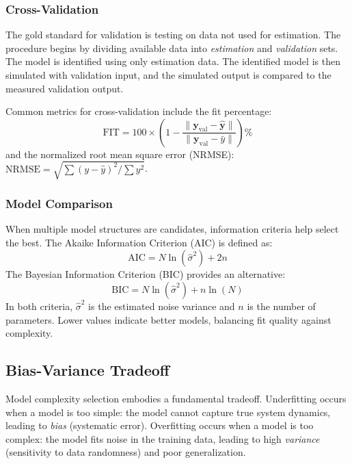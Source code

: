 \subsubsection{Cross-Validation}

The gold standard for validation is testing on data not used for estimation. The procedure begins by dividing available data into \textit{estimation} and \textit{validation} sets. The model is identified using only estimation data. The identified model is then simulated with validation input, and the simulated output is compared to the measured validation output.

Common metrics for cross-validation include the fit percentage:
\begin{equation}
\text{FIT} = 100 \times \left(1 - \frac{\|\mathbf{y}_\text{val} - \hat{\mathbf{y}}\|}{\|\mathbf{y}_\text{val} - \bar{y}\|}\right) \%
\label{eq:fit_percent}
\end{equation}
and the normalized root mean square error (NRMSE): $\text{NRMSE} = \sqrt{\sum(y - \hat{y})^2 / \sum y^2}$.

\subsubsection{Model Comparison}

When multiple model structures are candidates, information criteria help select the best. The Akaike Information Criterion (AIC) is defined as:
\begin{equation}
\text{AIC} = N \ln(\hat{\sigma}^2) + 2n
\label{eq:aic}
\end{equation}
The Bayesian Information Criterion (BIC) provides an alternative:
\begin{equation}
\text{BIC} = N \ln(\hat{\sigma}^2) + n \ln(N)
\label{eq:bic}
\end{equation}
In both criteria, $\hat{\sigma}^2$ is the estimated noise variance and $n$ is the number of parameters. Lower values indicate better models, balancing fit quality against complexity.

\subsection{Bias-Variance Tradeoff}
\label{subsec:bias_variance}

Model complexity selection embodies a fundamental tradeoff. Underfitting occurs when a model is too simple: the model cannot capture true system dynamics, leading to \textit{bias} (systematic error). Overfitting occurs when a model is too complex: the model fits noise in the training data, leading to high \textit{variance} (sensitivity to data randomness) and poor generalization.

